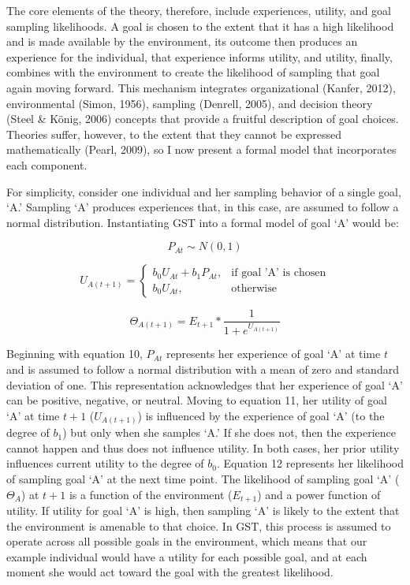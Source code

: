 \documentclass[english,,man]{apa6}
\theoremstyle{definition}
\theoremstyle{definition}
\theoremstyle{definition}
\theoremstyle{remark}
\begin{document}
The core elements of the theory, therefore, include experiences,
utility, and goal sampling likelihoods. A goal is chosen to the extent
that it has a high likelihood and is made available by the environment,
its outcome then produces an experience for the individual, that
experience informs utility, and utility, finally, combines with the
environment to create the likelihood of sampling that goal again moving
forward. This mechanism integrates organizational (Kanfer, 2012),
environmental (Simon, 1956), sampling (Denrell, 2005), and decision
theory (Steel \& König, 2006) concepts that provide a fruitful
description of goal choices. Theories suffer, however, to the extent
that they cannot be expressed mathematically (Pearl, 2009), so I now
present a formal model that incorporates each component.

For simplicity, consider one individual and her sampling behavior of a
single goal, `A.' Sampling `A' produces experiences that, in this case,
are assumed to follow a normal distribution. Instantiating GST into a
formal model of goal `A' would be:

\begin{equation}
P_{At} \sim {N}(0,1)
\end{equation}

\begin{equation}
U_{A(t+1)} = 
  \begin{cases}
  b_0 U_{At} + b_1 P_{At}, & \text{if goal 'A' is chosen}\\
  b_0 U_{At}, & \text{otherwise}
  \end{cases}
\end{equation}

\begin{equation}
\Theta_{A(t+1)} = E_{t+1} * {\frac {1}{1 + e^{U_{A(t+1)}}}}
\end{equation}

Beginning with equation 10, \(P_{At}\) represents her experience of goal
`A' at time \(t\) and is assumed to follow a normal distribution with a
mean of zero and standard deviation of one. This representation
acknowledges that her experience of goal `A' can be positive, negative,
or neutral. Moving to equation 11, her utility of goal `A' at time
\(t+1\) (\(U_{A(t+1)}\)) is influenced by the experience of goal `A' (to
the degree of \(b_1\)) but only when she samples `A.' If she does not,
then the experience cannot happen and thus does not influence utility.
In both cases, her prior utility influences current utility to the
degree of \(b_0\). Equation 12 represents her likelihood of sampling
goal `A' at the next time point. The likelihood of sampling goal `A'
(\(\Theta_{A}\)) at \(t+1\) is a function of the environment
(\(E_{t+1}\)) and a power function of utility. If utility for goal `A'
is high, then sampling `A' is likely to the extent that the environment
is amenable to that choice. In GST, this process is assumed to operate
across all possible goals in the environment, which means that our
example individual would have a utility for each possible goal, and at
each moment she would act toward the goal with the greatest likelihood.
\end{document}
